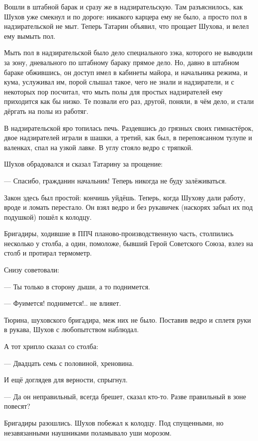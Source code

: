 Вошли в штабной барак и сразу же \dash в надзирательскую. Там разъяснилось, как Шухов уже
смекнул и по дороге: никакого карцера ему не было, а просто пол в надзирательской не мыт.
Теперь Татарин объявил, что прощает Шухова, и велел ему вымыть пол.

Мыть пол в надзирательской было дело специального зэка, которого не выводили за зону, \dash
дневального по штабному бараку прямое дело. Но, давно в штабном бараке обжившись, он доступ
имел в кабинеты майора, и начальника режима, и кума, услуживал им, порой слышал такое, чего не
знали и надзиратели, и с некоторых пор посчитал, что мыть полы для простых надзирателей ему
приходится как бы низко. Те позвали его раз, другой, поняли, в чём дело, и стали дёргать на
полы из работяг.

В надзирательской яро топилась печь. Раздевшись до грязных своих гимнастёрок, двое
надзирателей играли в шашки, а третий, как был, в перепоясанном тулупе и валенках, спал на
узкой лавке. В углу стояло ведро с тряпкой.

Шухов обрадовался и сказал Татарину за прощение:

--- Спасибо, гражданин начальник! Теперь никогда не буду залёживаться.

Закон здесь был простой: кончишь \dash уйдёшь. Теперь, когда Шухову дали работу, вроде и ломать
перестало. Он взял ведро и без рукавичек (наскорях забыл их под подушкой) пошёл к колодцу.

Бригадиры, ходившие в ППЧ \dash планово-производственную часть, столпились несколько у столба,
а один, помоложе, бывший Герой Советского Союза, взлез на столб и протирал термометр.

Снизу советовали:

--- Ты только в сторону дыши, а то поднимется.

--- Фуимется! \dash поднимется!.. не влияет.

Тюрина, шуховского бригадира, меж них не было. Поставив ведро и сплетя руки в рукава, Шухов с
любопытством наблюдал.

А тот хрипло сказал со столба:

--- Двадцать семь с половиной, хреновина.

И ещё доглядев для верности, спрыгнул.

--- Да он неправильный, всегда брешет, \dash сказал кто-то. \Dash Разве правильный в зоне повесят?

Бригадиры разошлись. Шухов побежал к колодцу. Под спущенными, но незавязанными наушниками
поламывало уши морозом.

